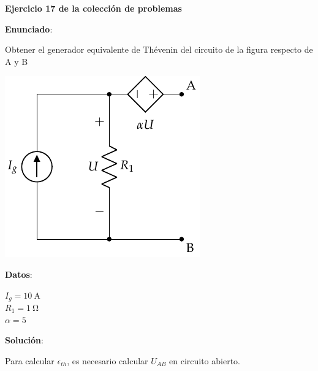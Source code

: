 \documentclass[10pt]{article}
\begin{document}
\large{\textbf{Ejercicio 17 de la colección de problemas}}

\vspace{3mm}
\large{\textbf{Enunciado}}:

\vspace{5mm}

Obtener el generador equivalente de Thévenin del circuito de la figura respecto de A y B

\vspace{3mm}

\begin{minipage}[c]{0.5\linewidth}
    \begin{center}
        \includegraphics[width=0.7\linewidth]{../figs/Thevenin1.pdf}
    \end{center}
\end{minipage}
\begin{minipage}[c]{0.5\linewidth}
    \textbf{Datos}:
    \vspace{2mm}
    
    $I_g = \qty{10}{\ampere}$\\[5pt]
    $R_1 = \qty{1}{\ohm}$\\[5pt]
    $\alpha = 5$
\end{minipage}


\vspace{3mm}

\hrulefill

\vspace{5mm}
\textbf{Solución}:
\vspace{4mm}

Para calcular $\epsilon_{th}$, es necesario calcular $U_{AB}$ en circuito abierto. 
\end{document}
